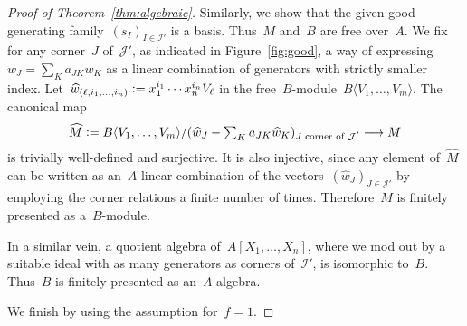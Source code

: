 \documentclass[oneside]{amsart}
\theoremstyle{definition}
\theoremstyle{plain}
\theoremstyle{remark}
\newcommand{\I}{\mathcal{I}}
\newcommand{\J}{\mathcal{J}}
\newcommand{\defeq}{\vcentcolon=}
\begin{document}
\begin{proof}[Proof of Theorem~\ref{thm:algebraic}]
Similarly, we show that the given good generating family~$(s_I)_{I \in \I'}$ is
a basis. Thus~$M$ and~$B$ are free over~$A$. We fix for any corner~$J$
of~$\J'$, as indicated in Figure~\ref{fig:good},
a way of expressing~$w_J = \sum_K a_{JK} w_K$ as a linear combination of
generators with strictly smaller index. Let~$\widehat w_{(\ell,i_1,\ldots,i_n)}
\defeq x_1^{i_1} \cdots x_n^{i_n} V_\ell$ in the free~$B$-module~$B\langle
V_1,\ldots, V_m\rangle$. The canonical map
\[ \widehat M \defeq B\langle V_1,\ldots, V_m\rangle/
  (\widehat w_J - \textstyle\sum_K a_{JK} \widehat w_K)_{\text{$J$ corner of~$\J'$}} \longrightarrow M
\]
is trivially well-defined and surjective. It is also injective, since any
element of~$\widehat M$ can be written as an~$A$-linear combination of the
vectors~$(\widehat w_J)_{J \in \J'}$ by employing the corner relations a finite
number of times.  Therefore~$M$ is finitely presented as a~$B$-module.

In a similar vein, a quotient algebra of~$A[X_1,\ldots,X_n]$, where
we mod out by a suitable ideal with as many generators as corners of~$\I'$, is
isomorphic to~$B$. Thus~$B$ is finitely presented as an~$A$-algebra.

We finish by using the assumption for~$f = 1$.
\end{proof}
\end{document}
